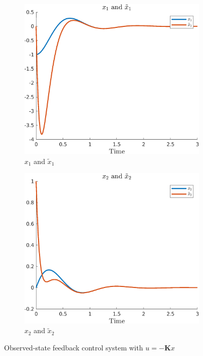 \documentclass{article}
\begin{document}
\begin{figure}[H]
    \centering
    \begin{subfigure}{0.325\textwidth}
        \centering
        \includegraphics[width = \textwidth]{figures/c1-x1-plot.png}
        \caption{$x_1$ and $\tilde{x}_1$}
    \end{subfigure}
    \begin{subfigure}{0.325\textwidth}
        \centering
        \includegraphics[width = \textwidth]{figures/c1-x2-plot.png}
        \caption{$x_2$ and $\tilde{x}_2$}
    \end{subfigure}
    \caption{Observed-state feedback control system with $u = -\boldsymbol{K}x$}
    \label{fig:c-1_results}
\end{figure}
\end{document}
